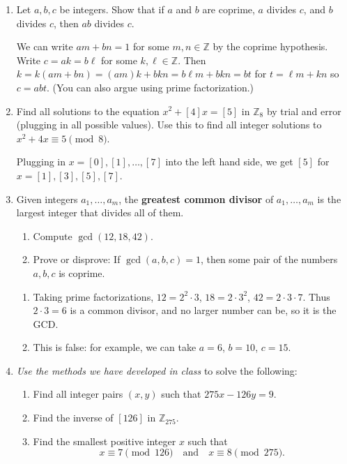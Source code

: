 \documentclass{amsart}
\def\Z{\mathbb Z}
\begin{document}
\begin{enumerate}

\item Let $a,b,c$ be integers. Show that if $a$ and $b$ are coprime, $a$ divides $c$, and $b$ divides $c$, then $ab$ divides $c$.


\begin{framed}
We can write $am+bn=1$ for some $m,n\in \Z$ by the coprime hypothesis. Write $c=ak=b\ell$ for some $k,\ell\in \Z$. Then $k = k(am+bn) = (am)k+bkn= b\ell m + bkn = bt$ for $t=\ell m + kn$ so $c=abt$. (You can also argue using prime factorization.)
\end{framed}

\item Find all solutions to the equation $x^2 + [4]x = [5]$ in $\Z_8$ by trial and error (plugging in all possible values). Use this to find all integer solutions to $x^2+ 4x \equiv 5 \pmod 8$.

\begin{framed}
Plugging in $x= [0], [1], \dots, [7]$ into the left hand side, we get $[5]$ for $x=[1],[3],[5],[7]$.
\end{framed}

\item  Given integers $a_1,\dots,a_m$, the \textbf{greatest common divisor} of $a_1,\dots,a_m$ is the largest integer that divides all of them. 
\begin{enumerate}
\item Compute $\gcd(12,18,42)$.
\item Prove or disprove: If $\gcd(a,b,c) = 1$, then some pair of the numbers $a,b,c$ is coprime.
\end{enumerate}

\begin{framed}
\begin{enumerate}
\item Taking prime factorizations, $12 = 2^2 \cdot 3$, $18 = 2 \cdot 3^2$, $42 = 2 \cdot 3 \cdot 7$. Thus $2\cdot 3 = 6$ is a common divisor, and no larger number can be, so it is the GCD. 
\item This is false: for example, we can take $a=6$, $b=10$, $c=15$.
\end{enumerate}
\end{framed}

\item \emph{Use the methods we have developed in class} to solve the following:
\begin{enumerate}
\item Find all integer pairs $(x,y)$ such that $275x-126y=9$.
\item Find the inverse of $[126]$ in $\Z_{275}$.
\item Find the smallest positive integer $x$ such that 
\[ x\equiv 7 \pmod{126} \quad\text{and}\quad x\equiv 8 \pmod{275}.\]
\end{enumerate}



\end{enumerate}
\end{document}
